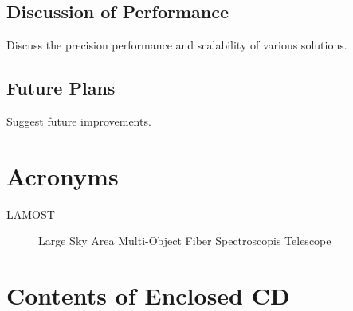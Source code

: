\documentclass[thesis=M,english]{FITthesis}[2012/10/20]
\begin{document}
\section{Discussion of Performance}

Discuss the precision performance and scalability of various solutions.

\section{Future Plans}

Suggest future improvements.




\appendix

\chapter{Acronyms}
\begin{description}
    \item[LAMOST] Large Sky Area Multi-Object Fiber Spectroscopis Telescope
\end{description}

\chapter{Contents of Enclosed CD}

\begin{figure}
\end{figure}
\end{document}
